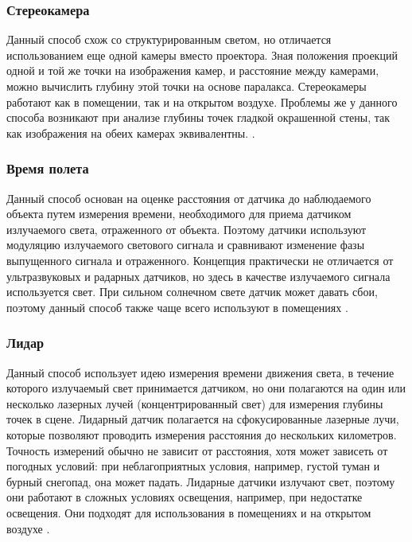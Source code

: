 \subsubsection*{Стереокамера}

Данный способ схож со структурированным светом, но отличается использованием еще одной камеры вместо проектора. Зная положения проекций одной и той же точки на изображения камер, и расстояние между камерами, можно вычислить глубину этой точки на основе паралакса. Стереокамеры работают как в помещении, так и на открытом воздухе. Проблемы же у данного способа возникают при анализе глубины точек гладкой окрашенной стены, так как изображения на обеих камерах эквивалентны. \cite{rgbd}.

\subsubsection*{Время полета}

Данный способ основан на оценке расстояния от датчика до наблюдаемого объекта путем измерения времени, необходимого для приема датчиком излучаемого света, отраженного от объекта. Поэтому датчики используют модуляцию излучаемого светового сигнала и сравнивают изменение фазы выпущенного сигнала и отраженного. Концепция практически не отличается от ультразвуковых и радарных датчиков, но здесь в качестве излучаемого сигнала используется свет. При сильном солнечном свете датчик может давать сбои, поэтому данный способ также чаще всего используют в помещениях \cite{rgbd}.

\subsubsection*{Лидар}

Данный способ использует идею измерения времени движения света, в течение которого излучаемый свет принимается датчиком, но они полагаются на один или несколько лазерных лучей (концентрированный свет) для измерения глубины точек в сцене. Лидарный датчик полагается на сфокусированные лазерные лучи, которые позволяют проводить измерения расстояния до нескольких километров. Точность измерений обычно не зависит от расстояния, хотя может зависеть от погодных условий: при неблагоприятных условия, например, густой туман и бурный снегопад, она может падать. Лидарные датчики излучают свет, поэтому они работают в сложных условиях освещения, например, при недостатке освещения. Они подходят для использования в помещениях и на открытом воздухе \cite{rgbd}.


